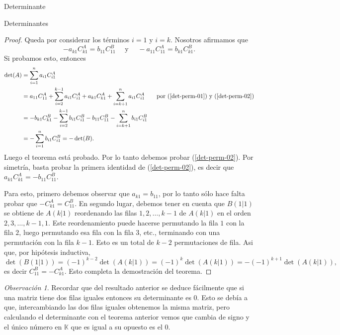 \documentclass[a4paper,12pt,twoside,spanish]{amsbook}
\theoremstyle{definition}
\theoremstyle{remark}
\newtheorem{observacion}{Observaci\'on}[section]
\newcommand{\K}{\mathbb K}
\begin{document}
\begin{chapter}{Determinante}
\begin{section}{Determinantes}
\begin{proof}
			Queda por considerar los términos $i = 1$ y $i = k$. Nosotros afirmamos que
			\begin{equation}\label{det-perm-02}
			-	a_{k1}C^A_{k1} =  b_{11}C^B_{11}  \quad \text{ y } \quad - a_{11}C^A_{11} = b_{k1}C^B_{k1}. 
			\end{equation}
			Si probamos esto, entonces 
			\begin{align*}
			\det(A) &= \sum_{i=1}^{n}  a_{i1}C^A_{i1} \\
			&= a_{11}C^A_{11} +  \sum_{i=2}^{k-1}  a_{i1}C^A_{i1} + a_{k1}C^A_{k1} + \sum_{i=k+1}^{n}  a_{i1}C^A_{i1}\qquad \text{por (\ref{det-perm-01}) y (\ref{det-perm-02})} \\
			&= -b_{k1}C^B_{k1} - \sum_{i=2}^{k-1}  b_{i1}C^B_{i1} - b_{11}C^B_{11} - \sum_{i=k+1}^{n}  b_{i1}C^B_{i1}  \\
			&= - \sum_{i=1}^{n}  b_{i1}C^B_{i1} =- \det(B).
			\end{align*}
			Luego el teorema está probado. Por lo tanto debemos probar (\ref{det-perm-02}). Por simetría, basta probar la primera identidad de (\ref{det-perm-02}),  es decir  que $	a_{k1}C^A_{k1} = - b_{11}C^B_{11}$. 
			
			Para esto, primero debemos observar que $a_{k1} = b_{11}$, por lo tanto sólo hace falta probar que $-C^A_{k1} = C^B_{11}$. En segundo lugar, debemos tener  en cuenta que $B(1|1)$ se obtiene de $A(k|1)$ reordenando las filas $1,2,\ldots, k -1$  de $A(k|1)$ en el orden $2,3, \ldots, k-1,1$. Este reordenamiento puede hacerse permutando la fila $1$ con la fila $2$, luego permutando esa fila con la fila $3$, etc., terminando con una permutación con la fila $k-1$. Esto es un total de $k - 2$  permutaciones de fila. Asi que, por hipótesis inductiva,
			\begin{equation*}
			\det(B(1|1)) = (-1)^{k-2}\det(A(k|1)) = (-1)^{k}\det(A(k|1)) = - (-1)^{k+1}\det(A(k|1)), 
			\end{equation*}
			es decir $C^B_{11} = -C^A_{k1}$. Esto completa la demostración del teorema.
		\end{proof}
		
	\begin{observacion}
		Recordar que del resultado anterior se deduce fácilmente que si una matriz tiene dos filas iguales entonces su determinante es 0. Esto se debía a que, intercambiando las dos filas iguales obtenemos la misma matriz, pero calculando el determinante con el teorema anterior vemos que cambia de signo y el único número en $\K$ que es igual a su opuesto es el 0. 
	\end{observacion}
		

\end{section}
\end{chapter}
\end{document}
